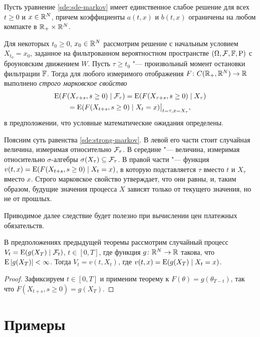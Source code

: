 \begin{theorem}
\label{sde:t:strong-markov}
Пусть уравнение \eqref{sde:sde-markov} имеет единственное слабое решение для всех $t\ge0$ и $x\in \mathbb{R}^N$, причем коэффициенты $a(t,x)$ и $b(t,x)$ ограничены на любом компакте в $\mathbb{R}_+\times\mathbb{R}^N$.

Для некоторых $t_0\ge0$, $x_0\in\mathbb{R}^N$ рассмотрим решение с начальным условием $X_{t_0}=x_0$, заданное на фильтрованном вероятностном пространстве $(\Omega,\mathcal{F},\mathbb{F},\mathrm{P})$ с броуновским движением $W$.
Пусть $\tau\ge t_0$ "--- произвольный момент остановки фильтрации $\mathbb{F}$.
Тогда для любого измеримого отображения $F\colon C(\mathbb{R}_+,\mathbb{R}^N) \to \mathbb{R}$ выполнено \emph{строго марковское свойство}%
\begin{multline}
\label{sde:strong-markov}
\operatorname{E} (F(X_{\tau + s}, s\ge 0) \mid \mathcal{F}_\tau) = \operatorname{E} (F(X_{\tau + s}, s\ge 0) \mid X_\tau) \\
= \operatorname{E}(F(X_{t+s}, s\ge 0) \mid X_t=x) \big|_{t=\tau,x=X_\tau},
\end{multline}
в предположении, что условные математические ожидания определены.
\end{theorem}

Поясним суть равенства \eqref{sde:strong-markov}.
В левой его части стоит случайная величина, измеримая относительно $\mathcal{F}_\tau$.
В середине "--- величина, измеримая относительно $\sigma$-алгебры $\sigma(X_\tau)\subseteq \mathcal{F}_\tau$.
В правой части "--- функция $v(t,x) = \operatorname{E}(F(X_{t+s}, s\ge 0) \mid X_t=x)$, в которую подставляется $\tau$ вместо $t$ и $X_\tau$ вместо $x$.
Строго марковское свойство утверждает, что они равны, и, таким образом, будущие значения процесса $X$ зависят только от текущего значения, но не от прошлых.

\medskip
Приводимое далее следствие будет полезно при вычислении цен платежных обязательств.

\begin{corollary}
В предположениях предыдущей теоремы рассмотрим случайный процесс $V_t = \operatorname{E}(g(X_T) \mid \mathcal{F}_t)$, $t\in[0,T]$, где функция $g\colon\mathbb{R}^N\to\mathbb{R}$ такова, что $\operatorname{E} |g(X_T)| < \infty$.
Тогда $V_t = v(t,X_t)$, где $v(t,x) = \operatorname{E}(g(X_T) \mid X_t=x)$.
\end{corollary}
\begin{proof}
Зафиксируем $t\in[0,T]$ и применим теорему к $F(\theta) = g(\theta_{T-t})$, так что $F(X_{t+s}, s\ge 0) = g(X_T)$.
\end{proof}


\section{Примеры}
